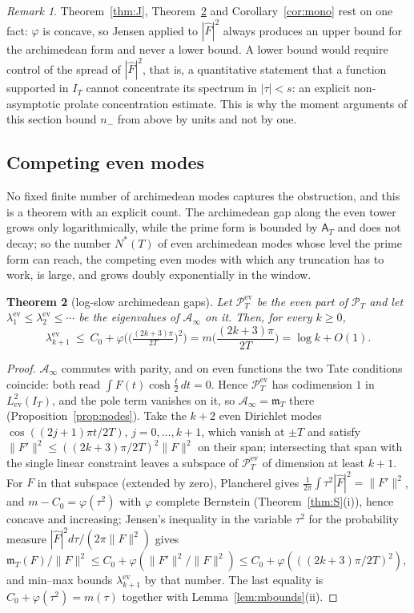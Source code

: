 \documentclass[11pt]{amsart}
\newtheorem{theorem}{Theorem}[section]
\theoremstyle{definition}
\theoremstyle{remark}
\newtheorem{remark}[theorem]{Remark}
\newcommand{\PT}{\mathcal P_T}
\newcommand{\IT}{I_T}
\newcommand{\Fh}{\widehat F}
\newcommand{\Aconst}{\mathsf A_T}
\newcommand{\Ainf}{\mathcal A_\infty}
\newcommand{\mT}{\mathfrak m_T}
\begin{document}
\begin{remark}
Theorem~\ref{thm:J}, Theorem~\ref{thm:arena} and Corollary~\ref{cor:mono} rest on one fact: $\varphi$ is
concave, so Jensen applied to $|\Fh|^2$ always produces an upper bound for the archimedean form
and never a lower bound. A lower bound would require control of the spread of $|\Fh|^2$, that is,
a quantitative statement that a function supported in $\IT$ cannot concentrate its spectrum in
$|\tau|<s$: an explicit non-asymptotic prolate concentration estimate. This is why the moment
arguments of this section bound $n_-$ from above by units and not by one.
\end{remark}

\subsection{Competing even modes}\label{subsec:arena}

No fixed finite number of archimedean modes captures the obstruction, and this is a theorem with an
explicit count. The archimedean gap along the even tower grows only logarithmically, while the prime
form is bounded by $\Aconst$ and does not decay; so the number $N^*(T)$ of even archimedean modes
whose level the prime form can reach, the competing even modes with which any truncation has to
work, is large, and grows doubly exponentially in the window.

\begin{theorem}[log-slow archimedean gaps]\label{thm:arena}
Let $\PT^{\mathrm{ev}}$ be the even part of $\PT$ and let
$\lambda^{\mathrm{ev}}_1\le\lambda^{\mathrm{ev}}_2\le\cdots$ be the eigenvalues of $\Ainf$ on it.
Then, for every $k\ge0$,
\[
\lambda^{\mathrm{ev}}_{k+1}\ \le\ C_0+\varphi\Big(\big(\tfrac{(2k+3)\pi}{2T}\big)^2\Big)
=m\Big(\frac{(2k+3)\pi}{2T}\Big)=\log k+O(1).
\]
\end{theorem}
\begin{proof}
$\Ainf$ commutes with parity, and on even functions the two Tate conditions coincide: both read
$\int F(t)\cosh\frac t2\,dt=0$. Hence $\PT^{\mathrm{ev}}$ has codimension $1$ in
$L^2_{\mathrm{ev}}(\IT)$, and the pole term vanishes on it, so $\Ainf=\mT$ there
(Proposition~\ref{prop:nodes}). Take the $k+2$ even Dirichlet modes $\cos((2j+1)\pi t/2T)$,
$j=0,\dots,k+1$, which vanish at $\pm T$ and satisfy
$\|F'\|^2\le((2k+3)\pi/2T)^2\|F\|^2$ on their span; intersecting that span with the single linear
constraint leaves a subspace of $\PT^{\mathrm{ev}}$ of dimension at least $k+1$. For $F$ in that subspace (extended by zero), Plancherel gives $\frac1{2\pi}\int\tau^2|\Fh|^2=\|F'\|^2$, and
$m-C_0=\varphi(\tau^2)$ with $\varphi$ complete Bernstein (Theorem~\ref{thm:S}(i)), hence concave and
increasing; Jensen's inequality in the variable $\tau^2$ for the probability measure
$|\Fh|^2d\tau/(2\pi\|F\|^2)$ gives
$\mT(F)/\|F\|^2\le C_0+\varphi(\|F'\|^2/\|F\|^2)\le C_0+\varphi(((2k+3)\pi/2T)^2)$, and
min--max bounds $\lambda^{\mathrm{ev}}_{k+1}$ by that number. The last equality is
$C_0+\varphi(\tau^2)=m(\tau)$ together with Lemma~\ref{lem:mbounds}(ii).
\end{proof}
\end{document}
